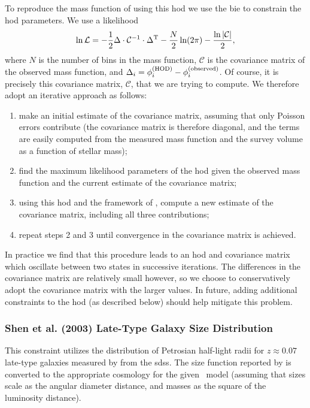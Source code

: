 To reproduce the mass function of \cite{martin_arecibo_2010} using this \gls{hod} we use the \gls{bie} \citep{weinberg_computational_2012} to constrain the \gls{hod} parameters. We use a likelihood
\begin{equation}
 \ln \mathcal{L} = -{1\over 2} \Delta\cdot \mathcal{C}^{-1}\cdot \Delta^{\rm T} - {N \over 2} \ln(2\pi) - {\ln |\mathcal{C}| \over 2},
\end{equation}
where $N$ is the number of bins in the mass function, $\mathcal{C}$ is the covariance matrix of the observed mass function, and $\Delta_i = \phi_i^{\rm (HOD)} - \phi_i^{\rm (observed)}$. Of course, it is precisely this covariance matrix, $\mathcal{C}$, that we are trying to compute. We therefore adopt an iterative approach as follows:
\begin{enumerate}
 \item make an initial estimate of the covariance matrix, assuming that only Poisson errors contribute (the covariance matrix is therefore diagonal, and the terms are easily computed from the measured mass function and the survey volume as a function of stellar mass);
 \item find the maximum likelihood parameters of the \gls{hod} given the observed mass function and the current estimate of the covariance matrix;
 \item using this \gls{hod} and the framework of \cite{smith_how_2012}, compute a new estimate of the covariance matrix, including all three contributions;
 \item repeat steps 2 and 3 until convergence in the covariance matrix is achieved.
\end{enumerate}
In practice we find that this procedure leads to an \gls{hod} and covariance matrix which oscillate between two states in successive iterations. The differences in the covariance matrix are relatively small however, so we choose to conservatively adopt the covariance matrix with the larger values. In future, adding additional constraints to the \gls{hod} (as described below) should help mitigate this problem.

\subsubsection{Shen et al. (2003) Late-Type Galaxy Size Distribution}\label{sec:SDSSLateTypeGalaxySizeDistribution}

This constraint utilizes the distribution of Petrosian half-light radii for $z\approx 0.07$ late-type galaxies measured by \cite{shen_size_2003} from the \gls{sdss}. The size function reported by \cite{shen_size_2003} is converted to the appropriate cosmology for the given \glc\ model (assuming that sizes scale as the angular diameter distance, and masses as the square of the luminosity distance).

